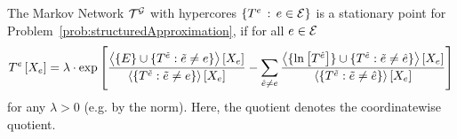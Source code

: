 \begin{theorem}\label{the:updateEquationStructuredVariational}
	The Markov Network $\mathcal{T}^{\mathcal{G}}$ with hypercores $\{T^{e}\, : \, e\in\mathcal{E}\}$ is a stationary point for Problem~\ref{prob:structuredApproximation}, if for all $e\in\mathcal{E}$
	\begin{align*}
	T^{e}\left[X_{e}\right]
	= \lambda\cdot \mathrm{exp}\left[
	\frac{
		\left\langle \{E\}\cup\{
		T^{\tilde{e}} : \tilde{e}\neq e
		\}\right\rangle \left[ X_{e} \right] 
	}{
		\left\langle \{
		T^{\tilde{e}} : \tilde{e}\neq e
		\}\right\rangle \left[ X_{e} \right] 
	}
	- \sum_{\hat{e}\neq e} 
		\frac{
		\left\langle \{\ln \left[ T^{\hat{e}} \right]\}\cup\{
		T^{\tilde{e}} : \tilde{e}\neq\hat{e}
		\}\right\rangle \left[ X_{e} \right] 
	}{
		\left\langle \{
		T^{\tilde{e}} : \tilde{e}\neq\hat{e}
		\}\right\rangle \left[ X_{e} \right] 
	}
	\right]
	\end{align*}
	for any $\lambda>0$ (e.g. by the norm).
	Here, the quotient denotes the coordinatewise quotient.
\end{theorem}
